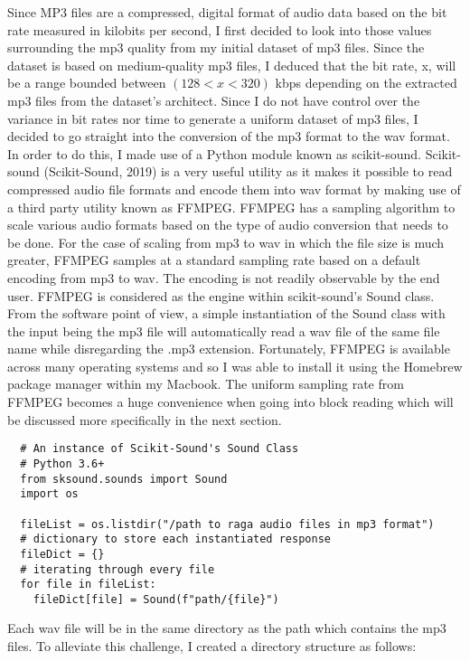 Since MP3 files are a compressed, digital format of audio data based on the bit rate measured in kilobits per second, I first decided to look into those values surrounding the mp3 quality from my initial dataset of mp3 files. Since the dataset is based on medium-quality mp3 files, I deduced that the bit rate, x, will be a range bounded between $ (128 < x < 320) $ kbps depending on the extracted mp3 files from the dataset's architect. Since I do not have control over the variance in bit rates nor time to generate a uniform dataset of mp3 files, I decided to go straight into the conversion of the mp3 format to the wav format. In order to do this, I made use of a Python module known as scikit-sound. Scikit-sound (Scikit-Sound, 2019) is a very useful utility as it makes it possible to read compressed audio file formats and encode them into wav format by making use of a third party utility known as FFMPEG. FFMPEG has a sampling algorithm to scale various audio formats based on the type of audio conversion that needs to be done. For the case of scaling from mp3 to wav in which the file size is much greater, FFMPEG samples at a standard sampling rate based on a default encoding from mp3 to wav. The encoding is not readily observable by the end user. FFMPEG is considered as the engine within scikit-sound's Sound class. From the software point of view, a simple instantiation of the Sound class with the input being the mp3 file will automatically read a wav file of the same file name while disregarding the .mp3 extension. Fortunately, FFMPEG is available across many operating systems and so I was able to install it using the Homebrew package manager within my Macbook. The uniform sampling rate from FFMPEG becomes a huge convenience when going into block reading which will be discussed more specifically in the next section.

\begin{lstlisting}
  # An instance of Scikit-Sound's Sound Class
  # Python 3.6+
  from sksound.sounds import Sound
  import os

  fileList = os.listdir("/path to raga audio files in mp3 format")
  # dictionary to store each instantiated response
  fileDict = {}
  # iterating through every file
  for file in fileList:
    fileDict[file] = Sound(f"path/{file}")
\end{lstlisting}

Each wav file will be in the same directory as the path which contains the mp3 files. To alleviate this challenge, I created a directory structure as follows:

